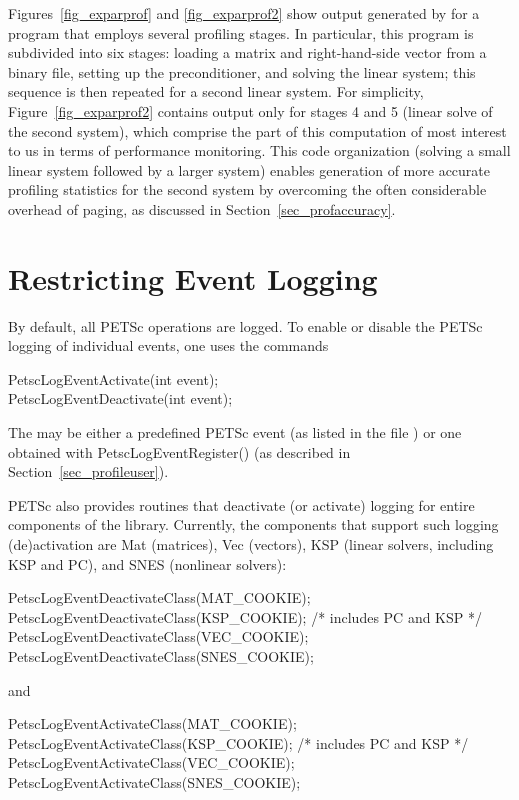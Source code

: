 {{Figures~\ref{fig_exparprof} and \ref{fig_exparprof2} show output
generated by  for a program that employs
several profiling stages.  In particular, this program is
subdivided into six stages: loading a matrix and right-hand-side
vector from a binary file, setting up the preconditioner, and solving
the linear system; this sequence is then repeated for a second linear
system.  For simplicity, Figure~\ref{fig_exparprof2} contains output
only for stages 4 and 5 (linear solve of the second system), which comprise
the part of this computation of most interest to us in terms of
performance monitoring.  This code organization (solving a small
linear system followed by a larger system) enables generation of more
accurate profiling statistics for the second system by overcoming the
often considerable overhead of paging, as discussed in
Section~\ref{sec_profaccuracy}.

\section{Restricting Event Logging}
\label{sec_deactivate}

By default, all PETSc operations are logged.
To enable or disable the PETSc logging of individual events, one uses the commands
\begin{tabbing}
   PetscLogEventActivate(int event);\\
   PetscLogEventDeactivate(int event);
\end{tabbing}
The  may be either a predefined PETSc event (as listed in
the file ) or one obtained with
PetscLogEventRegister() (as described in Section~\ref{sec_profileuser}).

PETSc also provides routines that deactivate (or activate)
logging for entire components of the library. Currently, the 
components that support such logging (de)activation are Mat (matrices),
Vec (vectors), KSP (linear solvers, including KSP 
and PC), and SNES (nonlinear solvers):
\begin{tabbing}
   PetscLogEventDeactivateClass(MAT\_COOKIE);\\
   PetscLogEventDeactivateClass(KSP\_COOKIE); /* includes PC and KSP */\\
   PetscLogEventDeactivateClass(VEC\_COOKIE);\\
   PetscLogEventDeactivateClass(SNES\_COOKIE);
\end{tabbing}
and 
\begin{tabbing}
   PetscLogEventActivateClass(MAT\_COOKIE);\\
   PetscLogEventActivateClass(KSP\_COOKIE);   /* includes PC and KSP */\\
   PetscLogEventActivateClass(VEC\_COOKIE);\\
   PetscLogEventActivateClass(SNES\_COOKIE);
\end{tabbing}

}}
